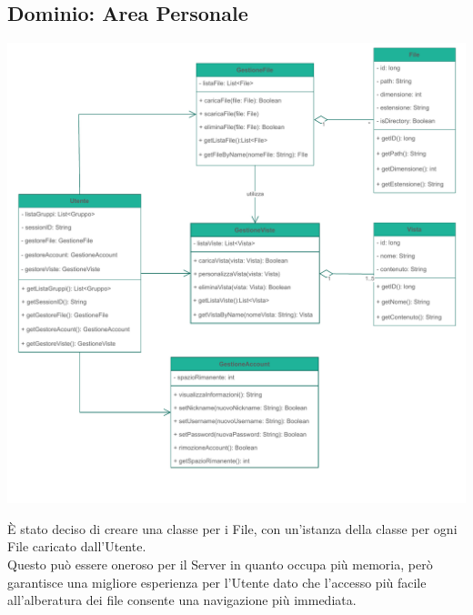 \subsection*{Dominio: Area Personale}
{}
\vspace{0.5cm}
\begin{adjustwidth}{-2cm}{0cm}
\includegraphics[scale=0.8]{progettazione/Progettazione-Area Personale.drawio.pdf}
\end{adjustwidth}
\vspace{1cm}
È stato deciso di creare una classe per i File, con un'istanza della classe per ogni File caricato dall'Utente.\\
Questo può essere oneroso per il Server in quanto occupa più memoria, però garantisce una migliore esperienza per l'Utente dato che l'accesso più facile all'alberatura dei file consente una navigazione più immediata.\\

